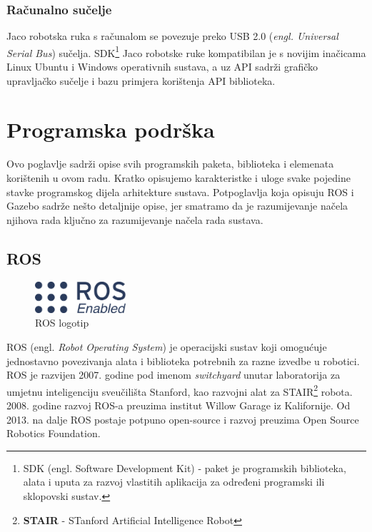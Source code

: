 \documentclass[times, utf8, diplomski, numeric]{fer}
\begin{document}

\subsection{Računalno sučelje}
Jaco robotska ruka s računalom se povezuje preko USB 2.0 (\textit{engl. Universal Serial Bus}) sučelja.
SDK\footnote{SDK (engl. Software Development Kit) - paket je programskih biblioteka, alata i uputa za razvoj vlastitih aplikacija za određeni programski ili sklopovski sustav.} Jaco robotske ruke kompatibilan je s novijim inačicama Linux Ubuntu i Windows operativnih sustava, a uz API sadrži grafičko upravljačko sučelje i bazu primjera korištenja API biblioteka.


\chapter{Programska podrška}
Ovo poglavlje sadrži opise svih programskih paketa, biblioteka i elemenata korištenih u ovom radu. 
Kratko opisujemo karakteristke i uloge svake pojedine stavke programskog dijela arhitekture sustava.
Potpoglavlja koja opisuju ROS i Gazebo sadrže nešto detaljnije opise, jer smatramo da je razumijevanje načela njihova rada ključno za razumijevanje načela rada sustava.

\section{ROS}
\begin{figure}[h!]
\centering
\includegraphics[width = 0.3\textwidth]{ros_enabled}
\caption{ROS logotip}
\end{figure}
ROS (engl. \textit{Robot Operating System}) je operacijski sustav koji omogućuje jednostavno povezivanja alata i biblioteka potrebnih za razne izvedbe u robotici. 
ROS je razvijen 2007. godine pod imenom \textit{switchyard} unutar laboratorija za umjetnu inteligenciju sveučilišta Stanford, kao razvojni alat za STAIR\footnote{\textbf{STAIR} - STanford Artificial Intelligence Robot} robota.
2008. godine razvoj ROS-a preuzima institut Willow Garage iz Kalifornije. 
Od 2013. na dalje ROS postaje potpuno open-source i razvoj preuzima Open Source Robotics Foundation.
\end{document}
